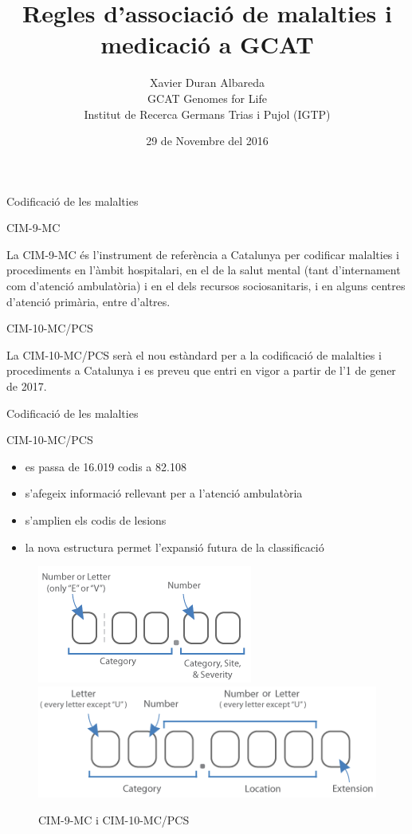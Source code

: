 \documentclass[ignorenonframetext,]{beamer}
\title{Regles d'associació de malalties i medicació a GCAT}
\author{Xavier Duran Albareda\\
GCAT Genomes for Life\\
Institut de Recerca Germans Trias i Pujol (IGTP)}
\date{29 de Novembre del 2016}
\providecommand{\tightlist}{%
\setlength{\itemsep}{0pt}\setlength{\parskip}{0pt}}
\begin{document}
\frame{\titlepage}

\begin{frame}{Codificació de les malalties}

\begin{block}{CIM-9-MC}

La CIM-9-MC és l'instrument de referència a Catalunya per codificar
malalties i procediments en l'àmbit hospitalari, en el de la salut
mental (tant d'internament com d'atenció ambulatòria) i en el dels
recursos sociosanitaris, i en alguns centres d'atenció primària, entre
d'altres.

\end{block}

\begin{block}{CIM-10-MC/PCS}

La CIM-10-MC/PCS serà el nou estàndard per a la codificació de malalties
i procediments a Catalunya i es preveu que entri en vigor a partir de
l'1 de gener de 2017.

\end{block}

\end{frame}

\begin{frame}{Codificació de les malalties}

\begin{block}{CIM-10-MC/PCS}

\begin{itemize}
\tightlist
\item
  es passa de 16.019 codis a 82.108
\item
  s'afegeix informació rellevant per a l'atenció ambulatòria
\item
  s'amplien els codis de lesions
\item
  la nova estructura permet l'expansió futura de la classificació
\end{itemize}

\begin{figure}[v]
  \mbox{\includegraphics[height=.8in]{images/Training_icd9_example.png}}
  \mbox{\includegraphics[height=.8in]{images/Training_icd10_conversionV2.png}}
  \caption{CIM-9-MC i CIM-10-MC/PCS}\label{fig:conversion}
\end{figure}

\end{block}

\end{frame}
\end{document}
